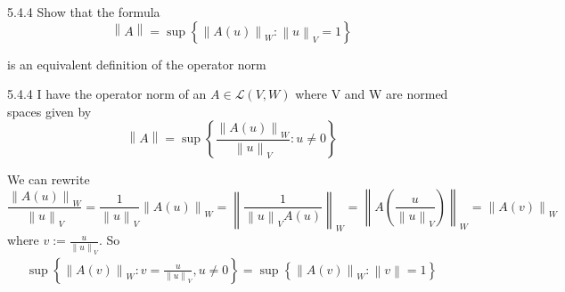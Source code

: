 \documentclass[a4paper,norsk]{article}
\begin{document}
\begin{oppgavebox}{5.4.4}{}
Show that the formula 
\[
    \left\lVert A \right\rVert = \sup \left\{ \left\lVert A \left( u \right)  \right\rVert_W : \left\lVert u \right\rVert _V = 1  \right\} 
\]

is an equivalent definition of the operator norm
\begin{proofbox}{5.4.4}{}
    I have the operator norm of an $ A \in \mathcal{L} \left( V, W \right)  $ where V and W are normed spaces given by
    \[
        \left\lVert A  \right\rVert = \sup \left\{ \frac{ \left\lVert A \left( u \right)  \right\rVert_W  }{ \left\lVert u \right\rVert _V } : u \neq 0 \right\} 
    \]

    We can rewrite
    \[
        \frac{ \left\lVert A (u) \right\rVert_W  }{ \left\lVert u \right\rVert_V  } = \frac{ 1 }{ \left\lVert u \right\rVert _V } \left\lVert A (u) \right\rVert _W = \left\lVert \frac{ 1 }{ \left\lVert u \right\rVert _V A(u) } \right\rVert_W = \left\lVert A \left( \frac{ u }{ \left\lVert u \right\rVert_V  } \right)  \right\rVert_W = \left\lVert A(v) \right\rVert_W   
    \]
    where $ v := \frac{ u }{ \left\lVert u \right\rVert_V } $. So
    \begin{align*}
        \sup \left\{ \left\lVert A(v) \right\rVert_W : v = \frac{ u }{ \left\lVert u \right\rVert _V }, u \neq 0  \right\} = \sup \left\{ \left\lVert A(v) \right\rVert_W : \left\lVert v \right\rVert = 1  \right\} 
    \end{align*}
\end{proofbox}
\end{oppgavebox}
\end{document}
